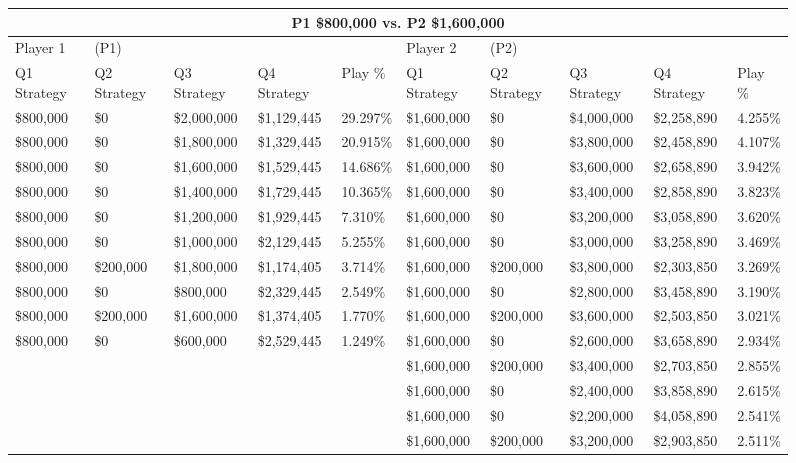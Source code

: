 \documentclass[11pt]{article}
\begin{document}
\begin{figure}
\tiny
\begin{tabular}{ |p{1.0cm}p{1.0cm}p{1.0cm}p{2.0cm}|p{1.0cm}||p{1.0cm}p{1.0cm}p{1.0cm}p{2.0cm}|p{1.0cm}|}
\hline
\multicolumn{10}{|c|}{P1 \$800,000 vs. P2 \$1,600,000} \\
\hline
Player 1 & (P1) & & & & Player 2 & (P2) & & & \\
\hline
Q1 Strategy & Q2 Strategy & Q3 Strategy & Q4 Strategy  &  Play \% & Q1 Strategy & Q2 Strategy & Q3 Strategy & Q4 Strategy  &  Play \%\\
\hline
\$800,000 & \$0 & \$2,000,000 & \$1,129,445 & 29.297\% & \$1,600,000 & \$0 & \$4,000,000 & \$2,258,890 & 4.255\% \\
\$800,000 & \$0 & \$1,800,000 & \$1,329,445 & 20.915\% & \$1,600,000 & \$0 & \$3,800,000 & \$2,458,890 & 4.107\% \\
\$800,000 & \$0 & \$1,600,000 & \$1,529,445 & 14.686\% & \$1,600,000 & \$0 & \$3,600,000 & \$2,658,890 & 3.942\% \\
\$800,000 & \$0 & \$1,400,000 & \$1,729,445 & 10.365\% & \$1,600,000 & \$0 & \$3,400,000 & \$2,858,890 & 3.823\% \\
\$800,000 & \$0 & \$1,200,000 & \$1,929,445 & 7.310\% & \$1,600,000 & \$0 & \$3,200,000 & \$3,058,890 & 3.620\% \\
\$800,000 & \$0 & \$1,000,000 & \$2,129,445 & 5.255\% & \$1,600,000 & \$0 & \$3,000,000 & \$3,258,890 & 3.469\% \\
\$800,000 & \$200,000 & \$1,800,000 & \$1,174,405 & 3.714\% & \$1,600,000 & \$200,000 & \$3,800,000 & \$2,303,850 & 3.269\% \\
\$800,000 & \$0 & \$800,000 & \$2,329,445 & 2.549\% & \$1,600,000 & \$0 & \$2,800,000 & \$3,458,890 & 3.190\% \\
\$800,000 & \$200,000 & \$1,600,000 & \$1,374,405 & 1.770\% & \$1,600,000 & \$200,000 & \$3,600,000 & \$2,503,850 & 3.021\% \\
\$800,000 & \$0 & \$600,000 & \$2,529,445 & 1.249\% & \$1,600,000 & \$0 & \$2,600,000 & \$3,658,890 & 2.934\% \\
&  &  &  &  & \$1,600,000 & \$200,000 & \$3,400,000 & \$2,703,850 & 2.855\% \\
&  &  &  &  & \$1,600,000 & \$0 & \$2,400,000 & \$3,858,890 & 2.615\% \\
&  &  &  &  & \$1,600,000 & \$0 & \$2,200,000 & \$4,058,890 & 2.541\% \\
&  &  &  &  & \$1,600,000 & \$200,000 & \$3,200,000 & \$2,903,850 & 2.511\% \\

\end{tabular}
\end{figure}
\end{document}
